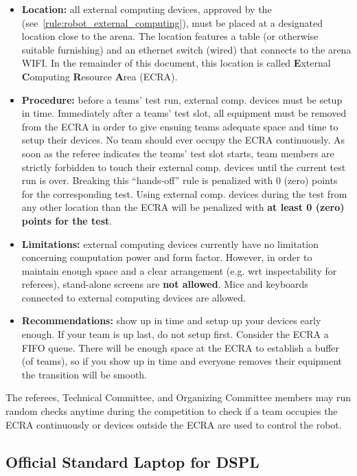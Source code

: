 \begin{itemize}
  \item \textbf{Location:} all external computing devices, approved by the 
  		(see~\ref{rule:robot_external_computing}), must be placed at a designated location close to the arena.
  		The location features a table (or otherwise suitable furnishing) and an ethernet switch (wired)
        that connects to the arena WIFI. In the remainder of this document, this location is called
  		\textbf{E}xternal \textbf{C}omputing \textbf{R}esource \textbf{A}rea (ECRA).
  \item \textbf{Procedure:} before a teams' test run, external comp. devices must be setup in time.
  		Immediately after a teams' test slot, all equipment must be removed from the ECRA in order to give ensuing
        teams adequate space and time to setup their devices. No team should ever occupy the ECRA continuously.
  		As soon as the referee indicates the teams' test slot starts, team members are strictly forbidden to touch
        their external comp. devices until the current test run is over. Breaking this ``hands-off'' rule
        is penalized with 0 (zero) points for the corresponding test. Using external comp. devices during the test
        from any other location than the ECRA will be penalized with \textbf{at least 0 (zero) points for the test}.
  \item \textbf{Limitations:} external computing devices currently have no limitation concerning computation
  		power and form factor. However, in order to maintain enough space and a	clear arrangement (e.g. wrt
        inspectability for referees), stand-alone screens are \textbf{not allowed}. Mice and keyboards connected
        to external computing devices are allowed.
  \item \textbf{Recommendations:} show up in time and setup up your devices early enough. If your team is up last,
        do not setup first. Consider the ECRA a FIFO queue. There will be enough space at the ECRA to establish a
        buffer (of teams), so if you show up in time and everyone removes their equipment the transition will be smooth.
\end{itemize}

The referees, Technical Committee, and Organizing Committee members may run random checks anytime during the competition
to check if a team occupies the ECRA continuously or devices outside the ECRA are used to control the robot.


\subsection{Official Standard Laptop for DSPL}
\label{rule:osl_dspl}
% 
% 

